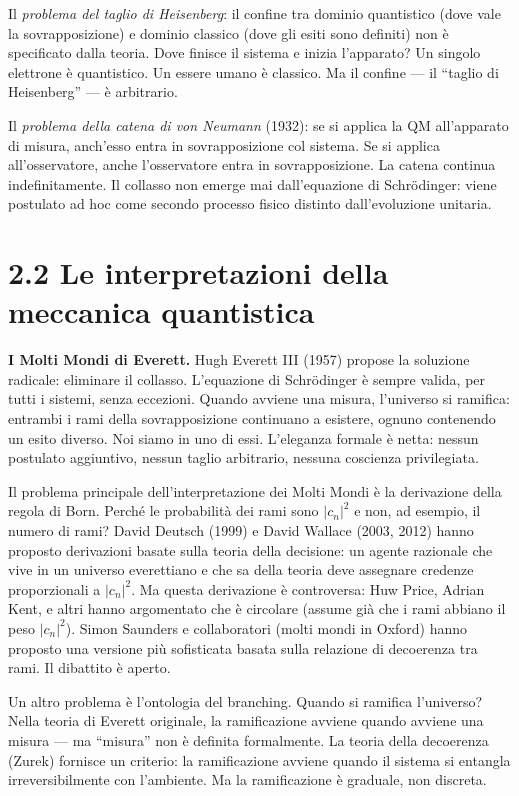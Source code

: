 \documentclass[11.5pt,a4paper,openany]{book}
\theoremstyle{remark}
\begin{document}
Il \textit{problema del taglio di Heisenberg}: il confine tra dominio quantistico (dove vale la sovrapposizione) e dominio classico (dove gli esiti sono definiti) non è specificato dalla teoria. Dove finisce il sistema e inizia l'apparato? Un singolo elettrone è quantistico. Un essere umano è classico. Ma il confine --- il ``taglio di Heisenberg'' --- è arbitrario.

Il \textit{problema della catena di von Neumann} (1932): se si applica la QM all'apparato di misura, anch'esso entra in sovrapposizione col sistema. Se si applica all'osservatore, anche l'osservatore entra in sovrapposizione. La catena continua indefinitamente. Il collasso non emerge mai dall'equazione di Schrödinger: viene postulato ad hoc come secondo processo fisico distinto dall'evoluzione unitaria.

\section{2.2 Le interpretazioni della meccanica quantistica}

\textbf{I Molti Mondi di Everett.} Hugh Everett III (1957) propose la soluzione radicale: eliminare il collasso. L'equazione di Schrödinger è sempre valida, per tutti i sistemi, senza eccezioni. Quando avviene una misura, l'universo si ramifica: entrambi i rami della sovrapposizione continuano a esistere, ognuno contenendo un esito diverso. Noi siamo in uno di essi. L'eleganza formale è netta: nessun postulato aggiuntivo, nessun taglio arbitrario, nessuna coscienza privilegiata.

Il problema principale dell'interpretazione dei Molti Mondi è la derivazione della regola di Born. Perché le probabilità dei rami sono $|c_n|^2$ e non, ad esempio, il numero di rami? David Deutsch (1999) e David Wallace (2003, 2012) hanno proposto derivazioni basate sulla teoria della decisione: un agente razionale che vive in un universo everettiano e che sa della teoria deve assegnare credenze proporzionali a $|c_n|^2$. Ma questa derivazione è controversa: Huw Price, Adrian Kent, e altri hanno argomentato che è circolare (assume già che i rami abbiano il peso $|c_n|^2$). Simon Saunders e collaboratori (molti mondi in Oxford) hanno proposto una versione più sofisticata basata sulla relazione di decoerenza tra rami. Il dibattito è aperto.

Un altro problema è l'ontologia del branching. Quando si ramifica l'universo? Nella teoria di Everett originale, la ramificazione avviene quando avviene una misura --- ma ``misura'' non è definita formalmente. La teoria della decoerenza (Zurek) fornisce un criterio: la ramificazione avviene quando il sistema si entangla irreversibilmente con l'ambiente. Ma la ramificazione è graduale, non discreta.
\end{document}
